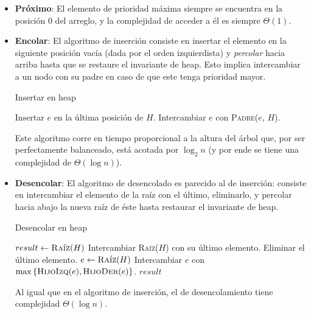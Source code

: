\documentclass{article}
\newcommand{\BigTheta}[1]{{\Theta(#1)}}
\begin{document}
\begin{itemize}
    \item \textbf{Próximo}: El elemento de prioridad máxima siempre se encuentra en la posición $0$ del arreglo, y la complejidad de acceder a él es siempre $\BigTheta{1}$.
    \item \textbf{Encolar}: El algoritmo de inserción consiste en insertar el elemento en la siguiente posición vacía (dada por el orden izquierdista) y \textit{percolar} hacia arriba hasta que se restaure el invariante de heap. Esto implica intercambiar a un nodo con su padre en caso de que este tenga prioridad mayor.
          \begin{algorithm}[H]
              \caption*{Insertar en heap}
              \begin{algorithmic}
                  \State Insertar $e$ en la última posición de $H$.
                  \State Intercambiar $e$ con \textsc{Padre}($e$, $H$).
                  \EndWhile
                  \EndFunction
              \end{algorithmic}
          \end{algorithm}

          Este algoritmo corre en tiempo proporcional a la altura del árbol que, por ser perfectamente balanceado, está acotada por $\log_2{n}$ (y por ende se tiene una complejidad de $\BigTheta{\log{n}}$).
    \item \textbf{Desencolar}: El algoritmo de desencolado es parecido al de inserción: consiste en intercambiar el elemento de la raíz con el último, eliminarlo, y percolar hacia abajo la nueva raíz de éste hasta restaurar el invariante de heap.
          \begin{algorithm}[H]
              \caption*{Desencolar en heap}
              \begin{algorithmic}
                  \State $result \gets\textsc{Raíz}(H)$
                  \State Intercambiar \textsc{Raíz}($H$) con su último elemento.
                  \State Eliminar el último elemento.
                  \State $e \gets \textsc{Raíz}(H)$
                  \State Intercambiar $e$ con $\max{\{\textsc{HijoIzq}(e), \textsc{HijoDer}(e)\}}$.
                  \EndWhile
                  \State \Return $result$
                  \EndFunction
              \end{algorithmic}
          \end{algorithm}

          Al igual que en el algoritmo de inserción, el de desencolamiento tiene complejidad $\BigTheta{\log{n}}$.
\end{itemize}
\end{document}
